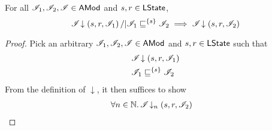 %
%
%
\begin{lemma}\label{lem:shift-closure}
%
For all $\mathscr{I}_1, \mathscr{I}_2, \mathscr{I} \in \textsf{AMod}$ and $s, r \in \textsf{LState}$,
%
\[
	\mathscr{I} \!\downarrow \left(s, r, \mathscr{I}_1\right) /| \mathscr{I}_1 \sqsubseteq^{\{s\}} \mathscr{I}_2 \implies \mathscr{I} \!\downarrow \left(s, r, \mathscr{I}_2\right)
\]
%
\begin{proof} Pick an arbitrary $\mathscr{I}_1, \mathscr{I}_2, \mathscr{I} \in \textsf{AMod}$ and $s, r \in \textsf{LState}$ such that 
%
\begin{align}
	& \mathscr{I} \!\downarrow \left(s, r, \mathscr{I}_1\right) \label{SC:Ass1}\\
	& \mathscr{I}_1 \sqsubseteq^{\{s\}} \mathscr{I}_2 \label{SC:Ass2}
\end{align} 
%
From the definition of $\downarrow$, it then suffices to show
%
\begin{align}
	& \forall n \in \mathbb{N}.\,  \mathscr{I} \!\downarrow_{n} \left(s, r, \mathscr{I}_2\right) \label{SC:Goal2}
\end{align}
%
%
%

\end{proof}
\end{lemma}
